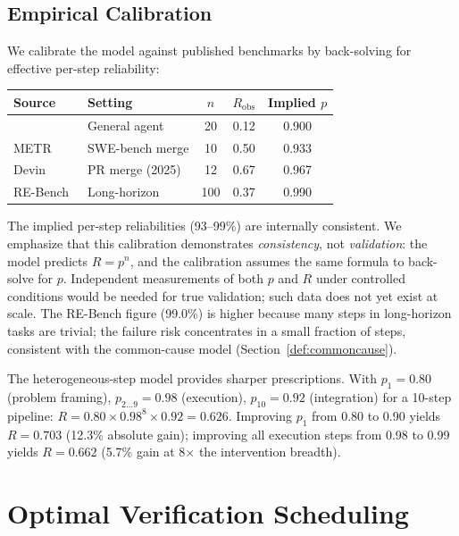 \documentclass[11pt, a4paper, logo, copyright]{googledeepmind}
\begin{document}
\subsection{Empirical Calibration}

We calibrate the model against published benchmarks by back-solving for effective per-step reliability:

\begin{center}
\begin{tabular}{llccc}
\toprule
Source & Setting & $n$ & $R_{\text{obs}}$ & Implied $p$ \\
\midrule
\citet{rajan2026math} & General agent & 20 & 0.12 & 0.900 \\
METR~\citep{metr2026swebench} & SWE-bench merge & 10 & 0.50 & 0.933 \\
Devin~\citep{cognition2025devin} & PR merge (2025) & 12 & 0.67 & 0.967 \\
RE-Bench~\citep{stanfordhai2025} & Long-horizon & 100 & 0.37 & 0.990 \\
\bottomrule
\end{tabular}
\end{center}

The implied per-step reliabilities (93--99\%) are internally consistent.
We emphasize that this calibration demonstrates \emph{consistency}, not \emph{validation}: the model predicts $R = p^n$, and the calibration assumes the same formula to back-solve for $p$.
Independent measurements of both $p$ and $R$ under controlled conditions would be needed for true validation; such data does not yet exist at scale.
The RE-Bench figure (99.0\%) is higher because many steps in long-horizon tasks are trivial; the failure risk concentrates in a small fraction of steps, consistent with the common-cause model (Section~\ref{def:commoncause}).

The heterogeneous-step model provides sharper prescriptions.
With $p_1 = 0.80$ (problem framing), $p_{2 \ldots 9} = 0.98$ (execution), $p_{10} = 0.92$ (integration) for a 10-step pipeline: $R = 0.80 \times 0.98^8 \times 0.92 = 0.626$.
Improving $p_1$ from 0.80 to 0.90 yields $R = 0.703$ (12.3\% absolute gain); improving all execution steps from 0.98 to 0.99 yields $R = 0.662$ (5.7\% gain at 8$\times$ the intervention breadth).

\section{Optimal Verification Scheduling}
\label{sec:verification}
\end{document}

